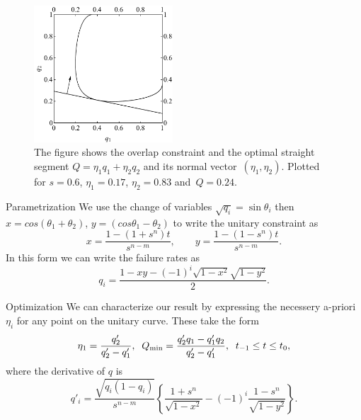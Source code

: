 \documentclass{beamer}
\begin{document}
\begin{frame}
\begin{figure}[t]
\centering
\includegraphics[width=14em]{Figures_CLONEvedit.pdf}
%
\caption{ The figure shows the overlap constraint and the optimal straight segment \mbox{$Q=\eta_1 q_1+\eta_2 q_2$} and its normal vector~$(\eta_1,\eta_2)$. Plotted for  $s = 0.6$, $\eta_1=0.17$, $\eta_2=0.83$ and~$Q=0.24$.}
\label{fig:1}
\end{figure}
\end{frame}
\begin{frame}{Parametrization}
We use the change of variables $\sqrt{q_i} = \sin \theta_i$ then $x = cos(\theta_1 + \theta_2)$, $y = (cos\theta_1 -\theta_2)$ to write the unitary constraint as
\[x=\frac{1-(1+s^n)t}{s^{n-m}},\qquad y=\frac{1-(1-s^n)t}{s^{n-m}}.\]
In this form we can write the failure rates as
\begin{equation}
q_i=\frac{1-xy-(-1)^i\sqrt{1-x^2}\sqrt{1-y^2}}{2}.
\end{equation}
\end{frame}
\begin{frame}{Optimization}
We can characterize our result by expressing the necessery a-priori $\eta_i$ for any point on the unitary curve.  These take the form
\begin{equation*}
\eta_1=\frac{q'_2}{q'_2-q'_1},\;\; Q_{\rm min}=\frac{q'_2 q_1-q'_1 q_2}{q'_2-q'_1},\;\; t_{-1}\le t\le t_0,
\label{main}
\end{equation*}
where the derivative of $q$ is
\begin{equation}
q'_i=\frac{\sqrt{q_i(1-q_i)}}{s^{n-m}}\left\{\frac{1+s^n}{\sqrt{1-x^2}}-(-1)^i\frac{1-s^n}{\sqrt{1-y^2}}\right\}.
\end{equation}
\end{frame}
\end{document}
